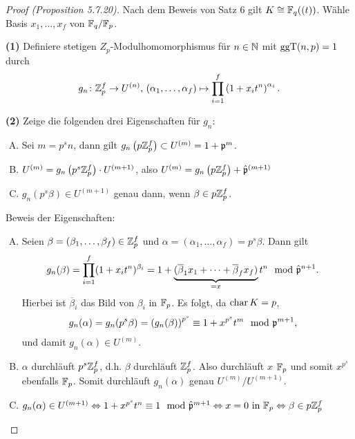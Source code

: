 \begin{proof}[Proof (Proposition 5.7.20)]
	Nach dem Beweis von Satz 6 gilt $K \cong \mathbb{F}_q((t))$.
	Wähle Basis $x_1,\dots,x_f$ von $\mathbb{F}_q / \mathbb{F}_p$.
	
	\bigskip \textbf{(1)} Definiere stetigen $Z_p$-Modulhomomorphismus für $n\in\mathbb{N}$ mit $\operatorname{ggT}(n,p) =1 $ durch
	\[ g_n \colon \mathbb{Z}_p^f \to U^{(n)}, \, (\alpha_1,\dots,\alpha_f) \mapsto
	\prod_{i=1}^{f} \left( 1+ x_it^n \right)^{\alpha_i}.
	\]
	
	\bigskip \textbf{(2)} Zeige die folgenden drei Eigenschaften für $g_n$:
	\begin{enumerate}[(A)]
		\item Sei $m=p^sn$, dann gilt $g_n \left( p \mathbb{Z}_p^f \right) \subset U^{(m)} = 1 + \mathfrak{p}^m$.
		\item $U^{(m)} =  g_n \left( p^s \mathbb{Z}_p^f \right) \cdot U^{(m+1)}$, also
				$U^{(m)} =  g_n \left( p \mathbb{Z}_p^f \right) + \hat{\mathfrak{p}}^{(m+1)}$
		\item$g_n\left( p^s\beta \right) \in U^{(m+1)}$ genau dann, wenn $\beta \in p \mathbb{Z}_p^f$.
	\end{enumerate}
	Beweis der Eigenschaften:
	\begin{enumerate}[(A)]
		\item Seien $\beta = (\beta_1, \dots, \beta_f) \in \mathbb{Z}_p^f$ und $\alpha=(\alpha_1,\dots, \alpha_f) = p^s\beta$. Dann gilt
		\begin{align*}
		g_n(\beta)
		&=\prod_{i=1}^{f} (1+x_it^n)^{\beta_i}
		= 1 + \underbrace{(\overline{\beta}_1 x_1 + \dots + \overline{\beta}_f x_f)}_{=x} t^n \mod \hat{\mathfrak{p}}^{n+1}.
		\end{align*}
		Hierbei ist $\overline{\beta}_i$ das Bild von $\beta_i$ in $\mathbb{F}_p$. Es folgt, da $\operatorname{char} K = p$,
		\begin{align*}
		g_n(\alpha)
		&= g_n(p^s\beta)
		= \left( g_n(\beta) \right)^{p^s}
		\equiv 1 + x^{p^s} t^m \mod {\mathfrak{p}}^{m+1},
		\end{align*}
		und damit $g_n(\alpha) \in U^{(m)}$.
		
		\item $\alpha$ durchläuft $p^s\mathbb{Z}_p^f$, d.h. $\beta$ durchläuft $\mathbb{Z}_p^f$. Also durchläuft $x$ $\mathbb{F}_p$ und somit $x^{p^s}$ ebenfalls $\mathbb{F}_p$. Somit durchläuft $g_n(\alpha)$ genau $U^{(m)} / U^{(m+1)}$.
		
		\item $g_n(\alpha) \in U^{(m+1)} \Leftrightarrow 1+x^{p^s} t^n \equiv 1 \mod \hat{\mathfrak{p}}^{m+1} \Leftrightarrow x = 0 \text{ in } \mathbb{F}_p 
		\Leftrightarrow \beta \in p \mathbb{Z}_p^f$
	\end{enumerate}
	

\end{proof}
